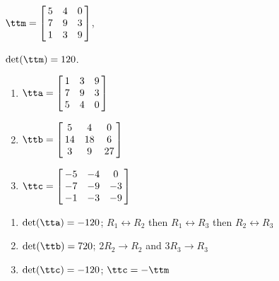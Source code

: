{$\ttm=\left[\hskip -3pt \begin{array}{ccc} 5&4&0\\  7&9&3
\\  1&3&9\end{array}\hskip -3pt \right] $,

 $\det(\ttm)=120$.
\begin{enumerate}
\item $\tta = \left[\hskip -3pt \begin{array}{ccc} 1&3&9\\  7&9&3
\\  5&4&0\end{array}\hskip -3pt \right] $
\item	$\ttb = \left[\hskip -3pt \begin{array}{ccc} 5&4&0\\  14&18&6
\\  3&9&27\end{array}\hskip -3pt \right]$
\item	$\ttc = \left[\hskip -3pt \begin{array}{ccc} -5&-4&0\\  -7&-9&-3
\\  -1&-3&-9\end{array}\hskip -3pt \right] $
\end{enumerate}} 
{\begin{enumerate}
\item $\det(\tta) = -120$; $R_1\leftrightarrow R_2$ then $R_1\leftrightarrow R_3$ then $R_2\leftrightarrow R_3$
\item $\det(\ttb) = 720$; $2R_2\rightarrow R_2$ and $3R_3\rightarrow R_3$
\item $\det(\ttc) = -120$; $\ttc = -\ttm$
\end{enumerate}}



  

